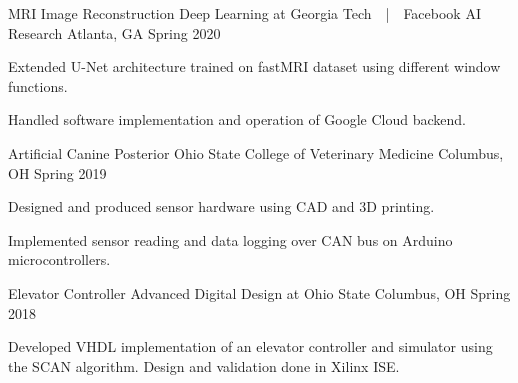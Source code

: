 

\begin{cventries}

  \cventry
    {MRI Image Reconstruction} %
    {Deep Learning at Georgia Tech~~|~~Facebook AI Research} %
    {Atlanta, GA} %
    {Spring 2020} %
    {
      \begin{cvitems} %
        \item {Extended U-Net architecture trained on fastMRI dataset using different window functions.}
        \item {Handled software implementation and operation of Google Cloud backend.}
      \end{cvitems}
    }

  \cventry
    {Artificial Canine Posterior} %
    {Ohio State College of Veterinary Medicine} %
    {Columbus, OH} %
    {Spring 2019} %
    {
      \begin{cvitems} %
        \item {Designed and produced sensor hardware using CAD and 3D printing.}
        \item {Implemented sensor reading and data logging over CAN bus on Arduino microcontrollers.}
      \end{cvitems}
    }

  \cventry
    {Elevator Controller} %
    {Advanced Digital Design at Ohio State} %
    {Columbus, OH} %
    {Spring 2018} %
    {
      \begin{cvitems} %
        \item {Developed VHDL implementation of an elevator controller and simulator using the SCAN algorithm. Design and validation done in Xilinx ISE.}
      \end{cvitems}
    }

\end{cventries}
